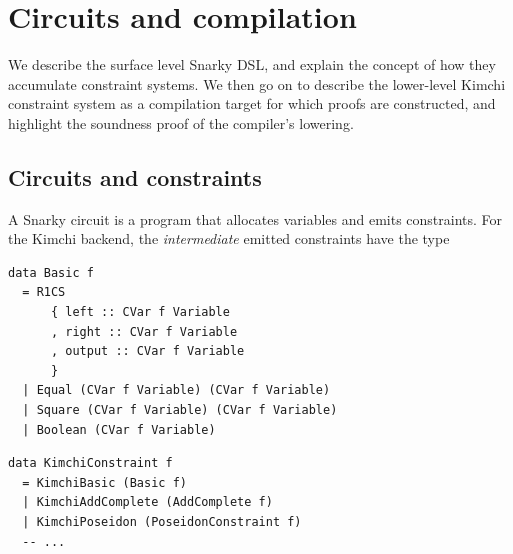 \documentclass[11pt,a4paper]{article}
\newenvironment{schematicblock}
  {\par\noindent\begin{minipage}{\linewidth}}
  {\end{minipage}\par}
\theoremstyle{definition}
\theoremstyle{insetstatement}
\begin{document}
\section{Circuits and compilation}
\label{sec:circuits-and-compilation}

We describe the surface level Snarky DSL, and explain the concept of
how they accumulate constraint systems. We then go on to describe the
lower-level Kimchi constraint system as a compilation target for which
proofs are constructed, and highlight the soundness proof of the
compiler's lowering.

\subsection{Circuits and constraints}
\label{sec:circuits-and-constraints}

A Snarky circuit is a program that allocates variables and emits constraints.
For the Kimchi backend, the \textit{intermediate} emitted constraints have the type

\begin{schematicblock}
\begin{lstlisting}[style=schematic,mathescape=false,morekeywords={data}]
data Basic f
  = R1CS
      { left :: CVar f Variable
      , right :: CVar f Variable
      , output :: CVar f Variable
      }
  | Equal (CVar f Variable) (CVar f Variable)
  | Square (CVar f Variable) (CVar f Variable)
  | Boolean (CVar f Variable)
\end{lstlisting}
\end{schematicblock}

\begin{schematicblock}
\begin{lstlisting}[style=schematic,mathescape=false,morekeywords={data}]
data KimchiConstraint f
  = KimchiBasic (Basic f)
  | KimchiAddComplete (AddComplete f)
  | KimchiPoseidon (PoseidonConstraint f)
  -- ...
\end{lstlisting}
\end{schematicblock}
\end{document}
